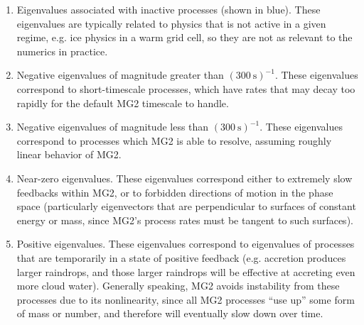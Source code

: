 \documentclass [11pt, proquest] {uwthesis}[2020/02/24]
\begin{document}
\begin{enumerate}
\item Eigenvalues associated with inactive processes (shown in blue). These eigenvalues are typically related to physics that is not active in a given regime, e.g. ice physics in a warm grid cell, so they are not as relevant to the numerics in practice.
\item Negative eigenvalues of magnitude greater than $(\SI{300}{\second})^{-1}$. These eigenvalues correspond to short-timescale processes, which have rates that may decay too rapidly for the default MG2 timescale to handle.
\item Negative eigenvalues of magnitude less than $(\SI{300}{\second})^{-1}$. These eigenvalues correspond to processes which MG2 is able to resolve, assuming roughly linear behavior of MG2.
\item Near-zero eigenvalues. These eigenvalues correspond either to extremely slow feedbacks within MG2, or to forbidden directions of motion in the phase space (particularly eigenvectors that are perpendicular to surfaces of constant energy or mass, since MG2's process rates must be tangent to such surfaces).
\item Positive eigenvalues. These eigenvalues correspond to eigenvalues of processes that are temporarily in a state of positive feedback (e.g. accretion produces larger raindrops, and those larger raindrops will be effective at accreting even more cloud water). Generally speaking, MG2 avoids instability from these processes due to its nonlinearity, since all MG2 processes ``use up'' some form of mass or number, and therefore will eventually slow down over time.
\end{enumerate}
\end{document}
